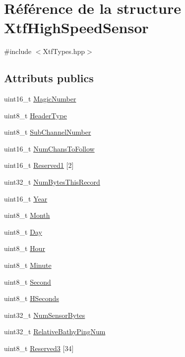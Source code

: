 \hypertarget{structXtfHighSpeedSensor}{}\section{Référence de la structure Xtf\+High\+Speed\+Sensor}
\label{structXtfHighSpeedSensor}


{\ttfamily \#include $<$Xtf\+Types.\+hpp$>$}

\subsection*{Attributs publics}
\begin{DoxyCompactItemize}
\item 
uint16\+\_\+t \hyperlink{structXtfHighSpeedSensor_ae32f2797cf01638b074bee15db0a5f77}{Magic\+Number}
\item 
uint8\+\_\+t \hyperlink{structXtfHighSpeedSensor_ae4740771a9002bb14f154279cf126262}{Header\+Type}
\item 
uint8\+\_\+t \hyperlink{structXtfHighSpeedSensor_a68d29497b9ec65a059e0f9e27a3b0c4d}{Sub\+Channel\+Number}
\item 
uint16\+\_\+t \hyperlink{structXtfHighSpeedSensor_af3a6fe6cba7a4fef51e4ecf6bc7fe8ad}{Num\+Chans\+To\+Follow}
\item 
uint16\+\_\+t \hyperlink{structXtfHighSpeedSensor_a2d163f84d520460fdda3e1d4439df765}{Reserved1} \mbox{[}2\mbox{]}
\item 
uint32\+\_\+t \hyperlink{structXtfHighSpeedSensor_af26bfd776e8ead6c7ae0dc0f4c84c5d4}{Num\+Bytes\+This\+Record}
\item 
uint16\+\_\+t \hyperlink{structXtfHighSpeedSensor_aca83e58646383cb49983443c17fd17f1}{Year}
\item 
uint8\+\_\+t \hyperlink{structXtfHighSpeedSensor_a4a06334dd7c569a3b5458c4da6b28043}{Month}
\item 
uint8\+\_\+t \hyperlink{structXtfHighSpeedSensor_ab320dc8e3f72356c8407930b9dbd9c30}{Day}
\item 
uint8\+\_\+t \hyperlink{structXtfHighSpeedSensor_a7eaaeeee7f6f3dce7cace5c930092dd2}{Hour}
\item 
uint8\+\_\+t \hyperlink{structXtfHighSpeedSensor_a94c043fa90b1b2374acdf723055245c5}{Minute}
\item 
uint8\+\_\+t \hyperlink{structXtfHighSpeedSensor_a971f97edb3a9c93b34dfbea528630643}{Second}
\item 
uint8\+\_\+t \hyperlink{structXtfHighSpeedSensor_a50758a19940e602e10e476f850ae7018}{H\+Seconds}
\item 
uint32\+\_\+t \hyperlink{structXtfHighSpeedSensor_a53a8fb36f82a430ff92bcc3486becbd1}{Num\+Sensor\+Bytes}
\item 
uint32\+\_\+t \hyperlink{structXtfHighSpeedSensor_a560af7e480e5d5f3c621c1ffec74a044}{Relative\+Bathy\+Ping\+Num}
\item 
uint8\+\_\+t \hyperlink{structXtfHighSpeedSensor_a59e39063c0aa58cbd2c2963fe1918844}{Reserved3} \mbox{[}34\mbox{]}
\end{DoxyCompactItemize}


